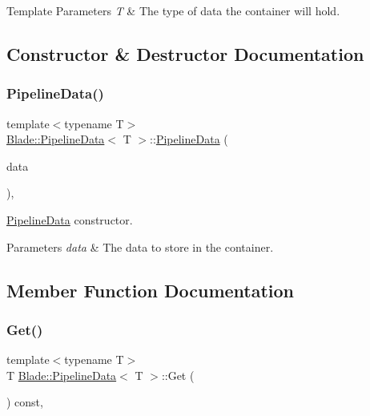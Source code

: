 \begin{DoxyTemplParams}{Template Parameters}
{\em T} & The type of data the container will hold. \\
\hline
\end{DoxyTemplParams}


\subsection{Constructor \& Destructor Documentation}
\mbox{\label{class_blade_1_1_pipeline_data_a0ec5d639a520d7c39593d62084788398}} 
\subsubsection{\texorpdfstring{Pipeline\+Data()}{PipelineData()}}
{\footnotesize\ttfamily template$<$typename T$>$ \\
\hyperlink{class_blade_1_1_pipeline_data}{Blade\+::\+Pipeline\+Data}$<$ T $>$\+::\hyperlink{class_blade_1_1_pipeline_data}{Pipeline\+Data} (\begin{DoxyParamCaption}\item[{T}]{data }\end{DoxyParamCaption})\hspace{0.3cm}{\ttfamily [inline]}, {\ttfamily [explicit]}}



\hyperlink{class_blade_1_1_pipeline_data}{Pipeline\+Data} constructor. 


\begin{DoxyParams}{Parameters}
{\em data} & The data to store in the container. \\
\hline
\end{DoxyParams}


\subsection{Member Function Documentation}
\mbox{\label{class_blade_1_1_pipeline_data_a5fabd7938e03537063559256d21c8253}} 
\subsubsection{\texorpdfstring{Get()}{Get()}}
{\footnotesize\ttfamily template$<$typename T$>$ \\
T \hyperlink{class_blade_1_1_pipeline_data}{Blade\+::\+Pipeline\+Data}$<$ T $>$\+::Get (\begin{DoxyParamCaption}{ }\end{DoxyParamCaption}) const\hspace{0.3cm}{\ttfamily [inline]}, {\ttfamily [noexcept]}}



